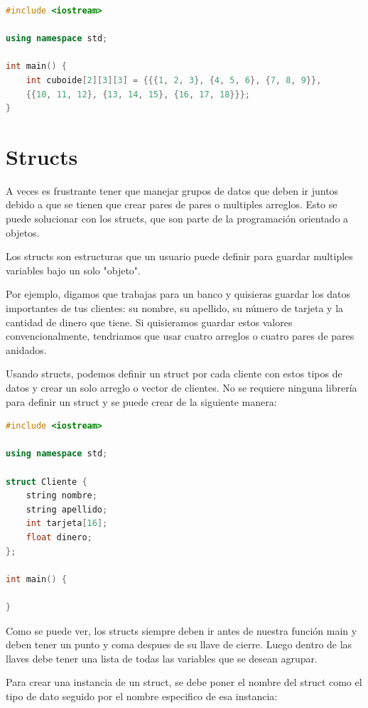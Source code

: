 \documentclass{article}
\begin{document}
\begin{lstlisting}[language=C++, caption=Asignando valores]
#include <iostream>

using namespace std;

int main() {
    int cuboide[2][3][3] = {{{1, 2, 3}, {4, 5, 6}, {7, 8, 9}},
    {{10, 11, 12}, {13, 14, 15}, {16, 17, 18}}};
}
\end{lstlisting}

\section{Structs}

A veces es frustrante tener que manejar grupos de datos que deben ir juntos debido a que se tienen que crear pares de pares o multiples arreglos. Esto se puede solucionar con los structs, que son parte de la programación orientado a objetos.

Los structs son estructuras que un usuario puede definir para guardar multiples variables bajo un solo "objeto".

Por ejemplo, digamos que trabajas para un banco y quisieras guardar los datos importantes de tus clientes: su nombre, su apellido, su número de tarjeta y la cantidad de dinero que tiene. Si quisieramos guardar estos valores convencionalmente, tendriamos que usar cuatro arreglos o cuatro pares de pares anidados.

Usando structs, podemos definir un struct por cada cliente con estos tipos de datos y crear un solo arreglo o vector de clientes. No se requiere ninguna librería para definir un struct y se puede crear de la siguiente manera:

\begin{lstlisting}[language=C++, caption=Definición de un struct]
#include <iostream>

using namespace std;

struct Cliente {
    string nombre;
    string apellido;
    int tarjeta[16];
    float dinero;
};

int main() {

}
\end{lstlisting}

Como se puede ver, los structs siempre deben ir antes de nuestra función main y deben tener un punto y coma despues de su llave de cierre. Luego dentro de las llaves debe tener una lista de todas las variables que se desean agrupar.

Para crear una instancia de un struct, se debe poner el nombre del struct como el tipo de dato seguido por el nombre especifico de esa instancia:
\end{document}
